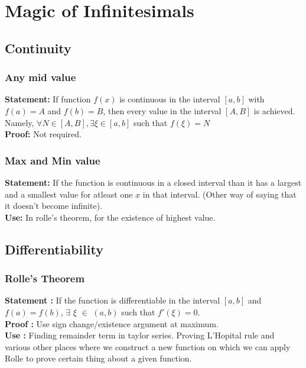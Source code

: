\documentclass{report}
\begin{document}
\chapter{Magic of Infinitesimals}
\section{Continuity}
\subsection{Any mid value}
\textbf{Statement:} If function $f(x)$ is continuous in the interval $[a,b]$ with $f(a) = A$ and $f(b) = B$, then every value in the interval $[A,B]$ is achieved. Namely, $\forall N \in [A,B], \exists \xi \in [a,b]$ such that $f(\xi) = N$ \\

\noindent\textbf{Proof:} Not required.

\subsection{Max and Min value}
\textbf{Statement:} If the function is continuous in a closed interval than it has a largest and a smallest value for atleast one $x$ in that interval. (Other way of saying that it doesn't become infinite). \\

\noindent\textbf{Use:} In rolle's theorem, for the existence of highest value.

\section{Differentiability}
\subsection{Rolle's Theorem}
\textbf{Statement :} If the function is differentiable in the interval $[a,b]$ and $f(a) = f(b)$, $\exists$ $\xi$ $\in$ $(a,b)$ such that $f'(\xi) = 0$. \\

\noindent\textbf{Proof :} Use sign change/existence argument at maximum.\\

\noindent\textbf{Use :} Finding remainder term in taylor series. Proving L'Hopital rule and various other places where we construct a new function on which we can apply Rolle to prove certain thing about a given function.\\
\end{document}
